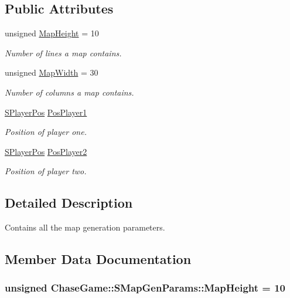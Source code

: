 \subsection*{Public Attributes}
\begin{DoxyCompactItemize}
\item 
unsigned \hyperlink{struct_chase_game_1_1_s_map_gen_params_a772c51dab66176dfe733e4e20cbf85d4}{Map\-Height} = 10
\begin{DoxyCompactList}\small\item\em Number of lines a map contains. \end{DoxyCompactList}\item 
unsigned \hyperlink{struct_chase_game_1_1_s_map_gen_params_a0897aeaa1a1a3a66697a6b441ca8c2de}{Map\-Width} = 30
\begin{DoxyCompactList}\small\item\em Number of columns a map contains. \end{DoxyCompactList}\item 
\hyperlink{struct_chase_game_1_1_s_player_pos}{S\-Player\-Pos} \hyperlink{struct_chase_game_1_1_s_map_gen_params_a8db28a9ee45a200d67b20fc803645501}{Pos\-Player1}
\begin{DoxyCompactList}\small\item\em Position of player one. \end{DoxyCompactList}\item 
\hyperlink{struct_chase_game_1_1_s_player_pos}{S\-Player\-Pos} \hyperlink{struct_chase_game_1_1_s_map_gen_params_afd0a0d4b22e228d547af88d38b6ae963}{Pos\-Player2}
\begin{DoxyCompactList}\small\item\em Position of player two. \end{DoxyCompactList}\end{DoxyCompactItemize}


\subsection{Detailed Description}
Contains all the map generation parameters. 

\subsection{Member Data Documentation}
\hypertarget{struct_chase_game_1_1_s_map_gen_params_a772c51dab66176dfe733e4e20cbf85d4}{
\subsubsection[{Map\-Height}]{\setlength{\rightskip}{0pt plus 5cm}unsigned Chase\-Game\-::\-S\-Map\-Gen\-Params\-::\-Map\-Height = 10}}\label{struct_chase_game_1_1_s_map_gen_params_a772c51dab66176dfe733e4e20cbf85d4}


